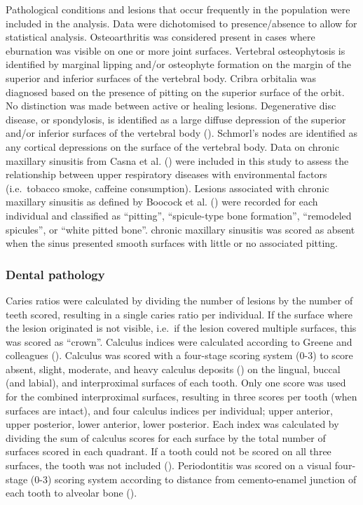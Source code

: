 \documentclass[
  11pt,
  leqno]{scrartcl}
\begin{document}
Pathological conditions and lesions that occur frequently in the
population were included in the analysis. Data were dichotomised to
presence/absence to allow for statistical analysis. Osteoarthritis was
considered present in cases where eburnation was visible on one or more
joint surfaces. Vertebral osteophytosis is identified by marginal
lipping and/or osteophyte formation on the margin of the superior and
inferior surfaces of the vertebral body. Cribra orbitalia was diagnosed
based on the presence of pitting on the superior surface of the orbit.
No distinction was made between active or healing lesions. Degenerative
disc disease, or spondylosis, is identified as a large diffuse
depression of the superior and/or inferior surfaces of the vertebral
body ().
Schmorl's nodes are identified as any cortical depressions on the
surface of the vertebral body. Data on chronic maxillary sinusitis from
Casna et al. ()
were included in this study to assess the relationship between upper
respiratory diseases with environmental factors (i.e.~tobacco smoke,
caffeine consumption). Lesions associated with chronic maxillary
sinusitis as defined by Boocock et al.
() were recorded for
each individual and classified as ``pitting'', ``spicule-type bone
formation'', ``remodeled spicules'', or ``white pitted bone''. chronic
maxillary sinusitis was scored as absent when the sinus presented smooth
surfaces with little or no associated pitting.

\subsubsection{Dental pathology}\label{dental-pathology}

Caries ratios were calculated by dividing the number of lesions by the
number of teeth scored, resulting in a single caries ratio per
individual. If the surface where the lesion originated is not visible,
i.e.~if the lesion covered multiple surfaces, this was scored as
``crown''. Calculus indices were calculated according to Greene and
colleagues ().
Calculus was scored with a four-stage scoring system (0-3) to score
absent, slight, moderate, and heavy calculus deposits
() on the
lingual, buccal (and labial), and interproximal surfaces of each tooth.
Only one score was used for the combined interproximal surfaces,
resulting in three scores per tooth (when surfaces are intact), and four
calculus indices per individual; upper anterior, upper posterior, lower
anterior, lower posterior. Each index was calculated by dividing the sum
of calculus scores for each surface by the total number of surfaces
scored in each quadrant. If a tooth could not be scored on all three
surfaces, the tooth was not included
().
Periodontitis was scored on a visual four-stage (0-3) scoring system
according to distance from cemento-enamel junction of each tooth to
alveolar bone ().
\end{document}

